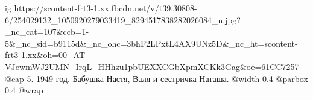  
 
 
 
 

\ifcmt
  ig https://scontent-frt3-1.xx.fbcdn.net/v/t39.30808-6/254029132_1050920279033419_8294517838282026084_n.jpg?_nc_cat=107&ccb=1-5&_nc_sid=b9115d&_nc_ohc=3bhF2LPxtL4AX9UNz5D&_nc_ht=scontent-frt3-1.xx&oh=00_AT-VJewmWJ2UMN_IrqL_HHhzu1pbUEXXCGbXpmXCKk3Gag&oe=61CC7257
  @cap 5. 1949 год. Бабушка Настя, Валя и сестричка Наташа. 
  @width 0.4
  @parbox 0.4
  @wrap \parpic[r]
\fi
